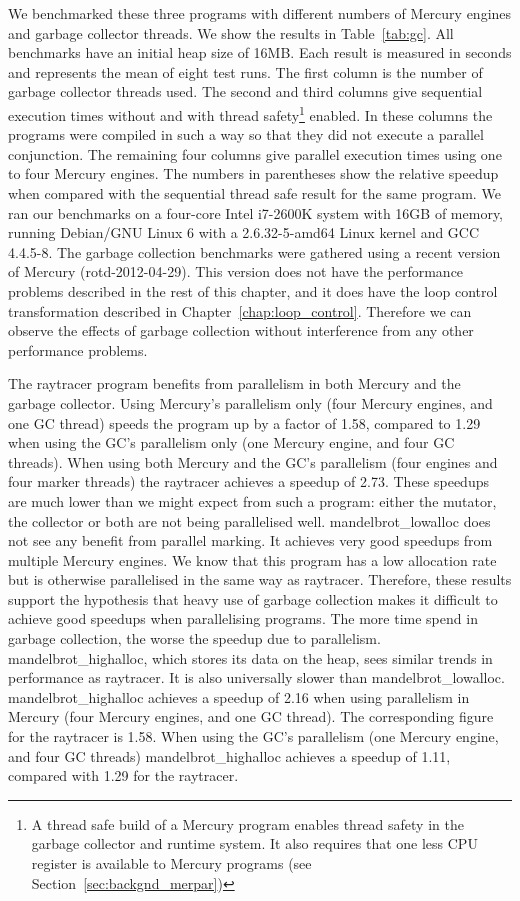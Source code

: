 We benchmarked these three programs with different numbers of Mercury
engines and garbage collector threads.
We show the results in Table~\ref{tab:gc}.
All benchmarks have an initial heap size of 16MB.
Each result is measured in seconds and represents the mean of eight test runs.
The first column is the number of garbage collector threads used.
The second and third columns give sequential execution times
without and with thread safety\footnote{
    A thread safe build of a Mercury program enables thread safety in the
    garbage collector and runtime system.
    It also requires that one less CPU register is available to Mercury
    programs (see Section~\ref{sec:backgnd_merpar})}
enabled.
In these columns the programs were compiled in such a way so that they did
not execute a parallel conjunction.
The remaining four columns give parallel execution times using one to four
Mercury engines.
The numbers in parentheses show the relative speedup when compared with the
sequential thread safe result for the same program.
\label{cabsav}
We ran our benchmarks on
a four-core Intel i7-2600K system
with 16GB of memory,
running Debian/GNU Linux 6
with a 2.6.32-5-amd64 Linux kernel and GCC 4.4.5-8.
The garbage collection benchmarks were gathered using a recent version of
Mercury (rotd-2012-04-29).
This version does not have the performance problems described in the
rest of this chapter,
and it does have the loop control transformation described
in Chapter~\ref{chap:loop_control}.
Therefore we can observe the effects of garbage collection without
interference from any other performance problems.

The raytracer program benefits from parallelism in both Mercury and the
garbage collector.
Using Mercury's parallelism only (four Mercury engines, and one GC thread) 
speeds the program up by a factor of 1.58,
compared to 1.29 when using the GC's parallelism only (one Mercury engine,
and four GC threads).
When using both Mercury and the GC's parallelism (four engines and four
marker threads)
the raytracer achieves a speedup of 2.73.
These speedups are much lower than we might expect from such a program:
either the mutator, the collector or both are not being parallelised well.
mandelbrot\_lowalloc does not see any benefit from parallel marking.
It achieves very good speedups from multiple Mercury engines.
We know that this program has a low allocation rate
but is otherwise parallelised in the same way as raytracer.
Therefore,
these results support the hypothesis that heavy use of garbage collection
makes it difficult to achieve good speedups when parallelising programs.
The more time spend in garbage collection,
the worse the speedup due to parallelism.
mandelbrot\_highalloc, which stores its data on the heap,
sees similar trends in performance as raytracer.
It is also universally slower than mandelbrot\_lowalloc.
mandelbrot\_highalloc achieves a speedup of 2.16 when using parallelism in
Mercury (four Mercury engines, and one GC thread).
The corresponding figure for the raytracer is 1.58.
When using the GC's parallelism
(one Mercury engine, and four GC threads)
mandelbrot\_highalloc achieves a speedup of 1.11,
compared with 1.29 for the raytracer.

